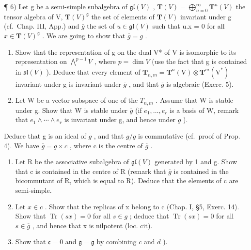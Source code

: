 ¶ 6) Let g be a semi-simple subalgebra of \(\mathfrak{gl}(V)\) , \(\mathbf{T}(V) = \bigoplus_{n=0}^{\infty} \mathbf{T}^{n}(V)\) the tensor algebra of V, \(\mathbf{T}(V)^{\mathfrak{g}}\) the set of elements of \(\mathbf{T}(V)\) invariant under g (cf.~Chap. III, App.) and \(\overline{g}\) the set of \(u \in \mathfrak{gl}(V)\) such that u.x = 0 for all \(x \in \mathbf{T}(V)^{\mathfrak{g}}\) . We are going to show that \(\overline{g} = g\) .

\begin{enumerate}
\def\labelenumi{\alph{enumi})}
\item
  Show that the representation of g on the dual V* of V is isomorphic to its representation on \(\bigwedge^{p-1}V\) , where \(p = \dim V\) (use the fact that g is contained in \(\mathfrak{sl}(V)\) ). Deduce that every element of \(\mathbf{T}_{n,m} = \mathbf{T}^{n}(\mathrm{V}) \otimes \mathbf{T}^{m}(\mathrm{V}^{*})\) invariant under g is invariant under \(\overline{g}\) , and that \(\overline{g}\) is algebraic (Exerc. 5).
\item
  Let W be a vector subspace of one of the \(T_{n,m}\) . Assume that W is stable under g. Show that W is stable under \(\overline{g}\) (if \(e_{1},\ldots,e_{r}\) is a basis of W, remark that \(e_{1}\wedge\cdots\wedge e_{r}\) is invariant under g, and hence under \(\overline{g}\) ).
\end{enumerate}

Deduce that g is an ideal of \(\overline{g}\) , and that \(\overline{g}/g\) is commutative (cf.~proof of Prop. 4). We have \(\overline{g} = g \times c\) , where c is the centre of \(\overline{g}\) .

\begin{enumerate}
\def\labelenumi{\alph{enumi})}
\setcounter{enumi}{2}
\item
  Let R be the associative subalgebra of \(\mathfrak{gl}(V)\) generated by 1 and g. Show that c is contained in the centre of R (remark that \(\overline{g}\) is contained in the bicommutant of R, which is equal to R). Deduce that the elements of c are semi-simple.
\item
  Let \(x \in c\) . Show that the replicas of x belong to c (Chap. I, §5, Exerc. 14). Show that \(\operatorname{Tr}(sx) = 0\) for all \(s \in g\) ; deduce that \(\operatorname{Tr}(sx) = 0\) for all \(s \in \overline{g}\) , and hence that x is nilpotent (loc. cit).
\item
  Show that \(\mathfrak{c} = 0\) and \(\overline{\mathfrak{g}} = \mathfrak{g}\) by combining \(c\) and \(d\) ).
\end{enumerate}

